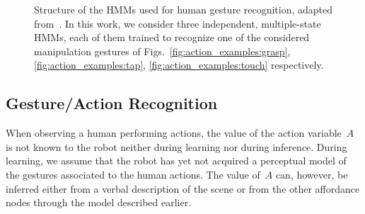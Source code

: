 \newcommand{\myscalefactor}{0.8}

\newcommand{\standardhmm}[1]{
    \node[draw,circle] (hmm#1s1) {$s_1$};
    \node[draw,circle, right of=hmm#1s1] (hmm#1s2) {$s_2$};
    \node[circle, right of=hmm#1s2] (hmm#1s3) {\dots};
    \node[draw,circle, right of=hmm#1s3] (hmm#1s4) {$s_Q$};
    \node[left of=hmm#1s1]  (invisible1) {};
    \node[right of=hmm#1s4] (invisible2) {};
    \path[->] (hmm#1s1) edge (hmm#1s2);
    \path[loop above] (hmm#1s1) edge (hmm#1s1);
    \path[->] (hmm#1s2) edge (hmm#1s3);
    \path[loop above] (hmm#1s2) edge (hmm#1s2);
    \path[dashed] (hmm#1s2) -- (hmm#1s3);
    \path[->] (hmm#1s3) edge (hmm#1s4);
    \path[loop above] (hmm#1s4) edge (hmm#1s4);
    \path[->] (invisible1) edge (hmm#1s1);
    \path[->] (hmm#1s4) edge (invisible2);
}

\newcommand{\modeltwo}{
}

\begin{figure}
  \centering
  \modeltwo
  \caption{Structure of the \acp{HMM} used for human gesture recognition, adapted from~\cite{saponaro:2013:crhri}. In this work, we consider three independent, multiple-state \acp{HMM}, each of them trained to recognize one of the considered manipulation gestures of Figs.~\ref{fig:action_examples:grasp}, \ref{fig:action_examples:tap}, \ref{fig:action_examples:touch} respectively.}
  \label{fig:hmms}
\end{figure}

\subsection{Gesture/Action Recognition}
When observing a human performing actions, the value of the action variable~$A$ is not known to the robot neither during learning nor during inference.
During learning, we assume that the robot has yet not acquired a perceptual model of the gestures associated to the human actions.
The value of~$A$ can, however, be inferred either from a verbal description of the scene or from the other affordance nodes through the \AffWords{} model described earlier.

